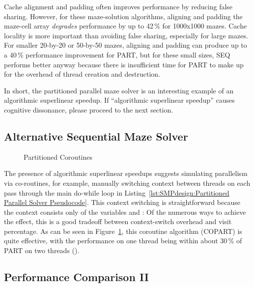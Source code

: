 Cache alignment and padding often improves performance by reducing
false sharing.
However, for these maze-solution algorithms, aligning and padding the
maze-cell array \emph{degrades} performance by up to 42\,\% for 1000x1000 mazes.
Cache locality is more important than avoiding
false sharing, especially for large mazes.
For smaller 20-by-20 or 50-by-50 mazes, aligning and padding can produce
up to a 40\,\% performance improvement for PART,
but for these small sizes, SEQ performs better anyway because there
is insufficient time for PART to make up for the overhead of
thread creation and destruction.

In short, the partitioned parallel maze solver is an interesting example
of an algorithmic superlinear speedup.
If ``algorithmic superlinear speedup'' causes cognitive dissonance,
please proceed to the next section.

\subsection{Alternative Sequential Maze Solver}
\label{sec:SMPdesign:Alternative Sequential Maze Solver}

\begin{figure}[tb]
\centering
{}
\caption{Partitioned Coroutines}
\label{fig:SMPdesign:Partitioned Coroutines}
\end{figure}

The presence of algorithmic superlinear speedups suggests simulating
parallelism via co-routines, for example, manually switching context
between threads on each pass through the main do-while loop in
Listing~\ref{lst:SMPdesign:Partitioned Parallel Solver Pseudocode}.
This context switching is straightforward because the context
consists only of the variables  and : Of the numerous
ways to achieve the effect, this is a good tradeoff between
context-switch overhead and visit percentage.
As can be seen in
Figure~\ref{fig:SMPdesign:Partitioned Coroutines},
this coroutine algorithm (COPART) is quite effective, with the performance
on one thread being within about 30\,\% of PART on two threads
().

\subsection{Performance Comparison II}
\label{sec:SMPdesign:Performance Comparison II}

